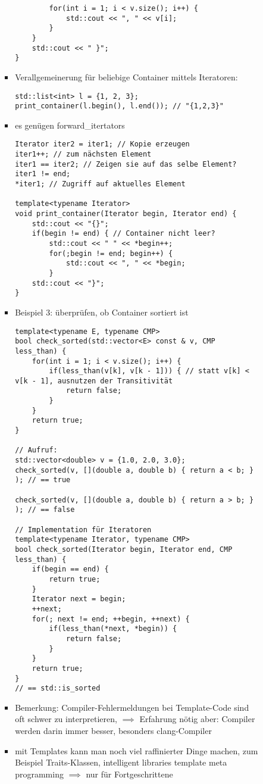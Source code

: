 \documentclass[a4paper]{scrartcl}
\theoremstyle{definition}
\theoremstyle{plain}
\theoremstyle{remark}
\theoremstyle{remark}
\begin{document}
\begin{itemize}
\begin{enumerate}
\begin{itemize}
\begin{itemize}
\begin{verbatim}
		for(int i = 1; i < v.size(); i++) {
			std::cout << ", " << v[i];
		}
	}
	std::cout << " }";
}
\end{verbatim}
\item Verallgemeinerung für beliebige Container mittels Iteratoren:
\begin{verbatim}
std::list<int> l = {1, 2, 3};
print_container(l.begin(), l.end()); // "{1,2,3}"
\end{verbatim}
\item es genügen forward\_itertators
\begin{verbatim}
Iterator iter2 = iter1; // Kopie erzeugen
iter1++; // zum nächsten Element
iter1 == iter2; // Zeigen sie auf das selbe Element?
iter1 != end;
*iter1; // Zugriff auf aktuelles Element

template<typename Iterator>
void print_container(Iterator begin, Iterator end) {
	std::cout << "{}";
	if(begin != end) { // Container nicht leer?
		std::cout << " " << *begin++;
		for(;begin != end; begin++) {
			std::cout << ", " << *begin;
		}
	std::cout << "}";
}
\end{verbatim}
\item Beispiel 3: überprüfen, ob Container sortiert ist
\begin{verbatim}
template<typename E, typename CMP>
bool check_sorted(std::vector<E> const & v, CMP less_than) {
	for(int i = 1; i < v.size(); i++) {
		if(less_than(v[k], v[k - 1])) { // statt v[k] < v[k - 1], ausnutzen der Transitivität
			return false;
		}
	}
	return true;
}

// Aufruf:
std::vector<double> v = {1.0, 2.0, 3.0};
check_sorted(v, [](double a, double b) { return a < b; } ); // == true

check_sorted(v, [](double a, double b) { return a > b; } ); // == false

// Implementation für Iteratoren
template<typename Iterator, typename CMP>
bool check_sorted(Iterator begin, Iterator end, CMP less_than) {
	if(begin == end) {
		return true;
	}
	Iterator next = begin;
	++next;
	for(; next != end; ++begin, ++next) {
		if(less_than(*next, *begin)) {
			return false;
		}
	}
	return true;
}
// == std::is_sorted
\end{verbatim}
\item Bemerkung: Compiler-Fehlermeldungen bei Template-Code sind oft schwer zu interpretieren, $\implies$ Erfahrung nötig aber: Compiler werden darin immer besser, besonders clang-Compiler
\item mit Templates kann man noch viel raffinierter Dinge machen, zum Beispiel Traits-Klassen, intelligent libraries template meta programming $\implies$ nur für Fortgeschrittene
\end{itemize}
\end{itemize}
\end{enumerate}
\end{itemize}
\end{document}
